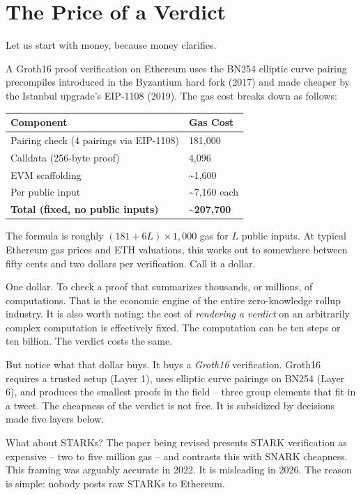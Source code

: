 \documentclass[
  11pt,
  openany]{report}
\renewcommand{\textbf}[1]{{\bfseries\color{MidnightBold}#1}}
\begin{document}
\section{The Price of a Verdict}\label{the-price-of-a-verdict}

Let us start with money, because money clarifies.

A Groth16 proof verification on Ethereum uses the BN254 elliptic curve pairing
precompiles introduced in the Byzantium hard fork (2017) and made cheaper by the
Istanbul upgrade's EIP-1108 (2019). The gas cost breaks down as follows:

\begin{longtable}[]{@{}ll@{}}
\toprule\noalign{}
Component & Gas Cost \\
\midrule\noalign{}
\arrayrulecolor{MidnightBlue}\midrule\arrayrulecolor{MidnightBorder}
\endhead
\bottomrule\noalign{}
\endlastfoot
Pairing check (4 pairings via EIP-1108) & 181,000 \\
Calldata (256-byte proof) & 4,096 \\
EVM scaffolding & \textasciitilde1,600 \\
Per public input & \textasciitilde7,160 each \\
\textbf{Total (fixed, no public inputs)} & \textbf{\textasciitilde207,700} \\
\end{longtable}

The formula is roughly \((181 + 6L) \times 1{,}000\) gas for \(L\) public
inputs. At typical Ethereum gas prices and ETH valuations, this works out to
somewhere between fifty cents and two dollars per verification. Call it a
dollar.

One dollar. To check a proof that summarizes thousands, or millions, of
computations. That is the economic engine of the entire zero-knowledge rollup
industry. It is also worth noting: the cost of \emph{rendering a verdict} on an
arbitrarily complex computation is effectively fixed. The computation can be ten
steps or ten billion. The verdict costs the same.

But notice what that dollar buys. It buys a \emph{Groth16} verification. Groth16
requires a trusted setup (Layer 1), uses elliptic curve pairings on BN254 (Layer
6), and produces the smallest proofs in the field -- three group elements that
fit in a tweet. The cheapness of the verdict is not free. It is subsidized by
decisions made five layers below.

What about STARKs? The paper being revised presents STARK verification as
expensive -- two to five million gas -- and contrasts this with SNARK cheapness.
This framing was arguably accurate in 2022. It is misleading in 2026. The reason
is simple: nobody posts raw STARKs to Ethereum.
\end{document}
